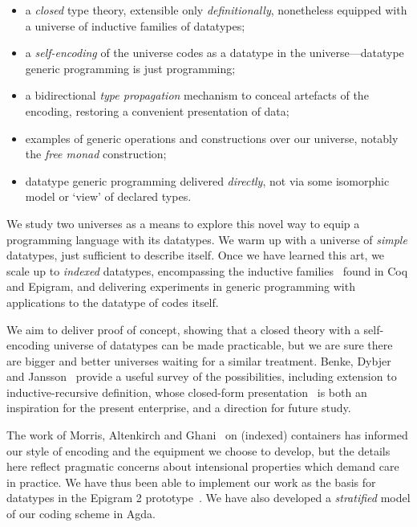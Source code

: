 \documentclass[preprint
              , authoryear
              ]{sigplanconf}
\begin{document}
\begin{itemize}
\item a \emph{closed} type theory, extensible only \emph{definitionally},
  nonetheless equipped with a universe of inductive families of datatypes;
\item a \emph{self-encoding} of the universe codes as a datatype in the
  universe---datatype generic programming is just programming;
\item a bidirectional \emph{type propagation} mechanism to conceal
  artefacts of the encoding, restoring
  a convenient presentation of data;
\item examples of generic operations and constructions over our universe,
  notably the \emph{free monad} construction;
\item datatype generic programming delivered \emph{directly},
  not via some isomorphic
  model or `view' of declared types.
\end{itemize}

We study two universes as a means to explore this novel way to equip a
programming language with its datatypes. We warm up with a universe of
\emph{simple} datatypes, just sufficient to describe itself. Once we
have learned this art, we scale up to \emph{indexed} datatypes,
encompassing the inductive families~\cite{dybjer:families,luo:utt}
found in Coq and Epigram, and delivering experiments in generic
programming with applications to the datatype of codes itself.

We aim to deliver proof of concept, showing that a closed theory with
a self-encoding universe of datatypes can be made practicable, but we
are sure there are bigger and better universes waiting for a similar
treatment. Benke, Dybjer and
Jansson~\cite{benke:universe-generic-prog} provide a useful survey of
the possibilities, including extension to inductive-recursive
definition, whose closed-form presentation~\cite{dybjer:axiom-ir,
  dybjer:ir-initial-algebra} is both an inspiration for the present
enterprise, and a direction for future study.

The work of Morris, Altenkirch and
Ghani~\cite{morris:PhD,morris:spf,alti:lics09} on
(indexed) containers has informed our style of encoding and the
equipment we choose to develop, but the details here reflect pragmatic
concerns about intensional properties which demand care in
practice. We have thus been able to implement our work as the basis
for datatypes in the Epigram 2 prototype~\cite{pigs:epigram}. We
have also developed a \emph{stratified} model of our coding scheme
in Agda.
\end{document}
